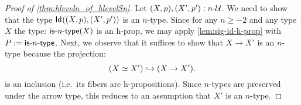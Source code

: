 \begin{proof}[Proof of \autoref{thm:hleveln_of_hlevelSn}]
 Let $(X, p), (X', p') : n\mbox{-}\mathcal{U}$. We need to show that the type $\mathsf{Id}_{}((X, p),(X', p'))$ is an $n$-type. Since for any $n \geq -2$ and any type $X$ the type: $\mathsf{is}\mbox{-}{n}\mbox{-}\mathsf{type}(X)$ is an h-prop, we may apply \autoref{lem:sig-id-h-prop} with $P := \mathsf{is}\mbox{-}{n}\mbox{-}\mathsf{type}$. Next, we observe that it suffices to show that $X \rightarrow X'$ is an $n$-type because the projection:
 \[(X \simeq X') \hookrightarrow (X \rightarrow X').\]
 is an inclusion (i.e.~its fibers are h-propositions). Since $n$-types are preserved under the arrow type, this reduces to an assumption that $X'$ is an $n$-type.
\end{proof} 
